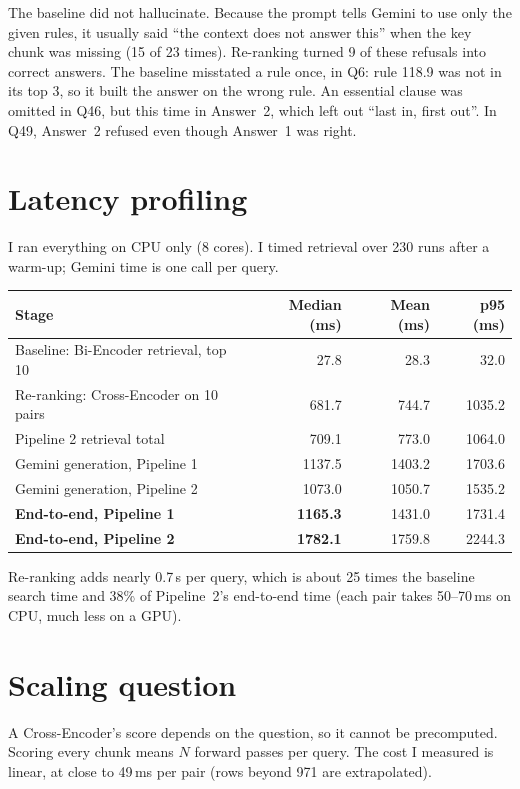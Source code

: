 \documentclass[11pt,a4paper]{article}
\begin{document}
The baseline did not hallucinate. Because the prompt tells Gemini to use only the given rules, it usually said ``the context does not answer this'' when the key chunk was missing (15 of 23 times). Re-ranking turned 9 of these refusals into correct answers. The baseline misstated a rule once, in Q6: rule 118.9 was not in its top 3, so it built the answer on the wrong rule. An essential clause was omitted in Q46, but this time in Answer~2, which left out ``last in, first out''. In Q49, Answer~2 refused even though Answer~1 was right.

\section{Latency profiling}
I ran everything on CPU only (8 cores). I timed retrieval over 230 runs after a warm-up; Gemini time is one call per query.

\begin{center}
\small
\begin{tabular}{lrrr}
\toprule
Stage & Median (ms) & Mean (ms) & p95 (ms) \\
\midrule
Baseline: Bi-Encoder retrieval, top 10 & 27.8 & 28.3 & 32.0 \\
Re-ranking: Cross-Encoder on 10 pairs & 681.7 & 744.7 & 1035.2 \\
Pipeline 2 retrieval total & 709.1 & 773.0 & 1064.0 \\
Gemini generation, Pipeline 1 & 1137.5 & 1403.2 & 1703.6 \\
Gemini generation, Pipeline 2 & 1073.0 & 1050.7 & 1535.2 \\
\textbf{End-to-end, Pipeline 1} & \textbf{1165.3} & 1431.0 & 1731.4 \\
\textbf{End-to-end, Pipeline 2} & \textbf{1782.1} & 1759.8 & 2244.3 \\
\bottomrule
\end{tabular}
\end{center}

Re-ranking adds nearly 0.7\,s per query, which is about 25 times the baseline search time and 38\% of Pipeline~2's end-to-end time (each pair takes 50--70\,ms on CPU, much less on a GPU).

\section{Scaling question}
A Cross-Encoder's score depends on the question, so it cannot be precomputed. Scoring every chunk means $N$ forward passes per query. The cost I measured is linear, at close to 49\,ms per pair (rows beyond 971 are extrapolated).
\end{document}
